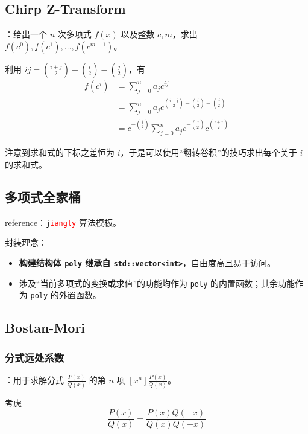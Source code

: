 \subsection{Chirp Z-Transform}

：给出一个 $n$ 次多项式 $f(x)$ 以及整数 $c, m$，求出 $f(c^0), f(c^1), \dots, f(c^{m - 1})$。

利用 $ij = \binom{i + j}{2} - \binom{i}{2} - \binom{j}{2}$，有
\[
\begin{aligned}
f(c^i) & = \sum\limits_{j = 0}^n a_jc^{ij} \\
& = \sum\limits_{j = 0}^n a_jc^{\binom{i + j}{2} - \binom{i}{2} - \binom{j}{2}} \\
& = c^{-\binom{i}{2}}\sum\limits_{j = 0}^n a_jc^{-\binom{j}{2}} c^{\binom{i + j}{2}}
\end{aligned}
\]

注意到求和式的下标之差恒为 $i$，于是可以使用“翻转卷积”的技巧求出每个关于 $i$ 的求和式。

\subsection{多项式全家桶}

reference：\texttt{\textcolor{black}{j}\textcolor{red}{iangly}} 算法模板。

封装理念：

\begin{itemize}
    \item \textbf{构建结构体 \texttt{poly} 继承自 \texttt{std::vector<int>}}，自由度高且易于访问。
    \item 涉及“当前多项式的变换或求值”的功能均作为 \texttt{poly} 的内置函数；其余功能作为 \texttt{poly} 的外置函数。
\end{itemize}


\subsection{Bostan-Mori}

\subsubsection{分式远处系数}

：用于求解分式 $\frac{P(x)}{Q(x)}$ 的第 $n$ 项 $[x^n]\frac{P(x)}{Q(x)}$。

考虑
\[
\frac{P(x)}{Q(x)} = \frac{P(x)Q(-x)}{Q(x)Q(-x)}
\]

